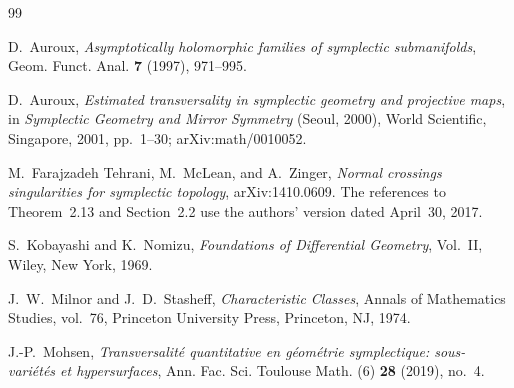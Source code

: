 \documentclass[11pt]{article}
\theoremstyle{definition}
\theoremstyle{remark}
\begin{document}
\begin{thebibliography}{99}

D.~Auroux,
\emph{Asymptotically holomorphic families of symplectic submanifolds},
Geom. Funct. Anal. \textbf{7} (1997), 971--995.

D.~Auroux,
\emph{Estimated transversality in symplectic geometry and projective maps},
in \emph{Symplectic Geometry and Mirror Symmetry}
(Seoul, 2000), World Scientific, Singapore, 2001, pp.~1--30;
arXiv:math/0010052.

M.~Farajzadeh Tehrani, M.~McLean, and A.~Zinger,
\emph{Normal crossings singularities for symplectic topology},
arXiv:1410.0609.
The references to Theorem~2.13 and Section~2.2 use the authors'
version dated April~30, 2017.

S.~Kobayashi and K.~Nomizu,
\emph{Foundations of Differential Geometry}, Vol.~II,
Wiley, New York, 1969.

J.~W.~Milnor and J.~D.~Stasheff,
\emph{Characteristic Classes},
Annals of Mathematics Studies, vol.~76,
Princeton University Press, Princeton, NJ, 1974.

J.-P.~Mohsen,
\emph{Transversalit\'e quantitative en g\'eom\'etrie symplectique:
sous-vari\'et\'es et hypersurfaces},
Ann. Fac. Sci. Toulouse Math. (6) \textbf{28} (2019), no.~4.

\end{thebibliography}
\end{document}

